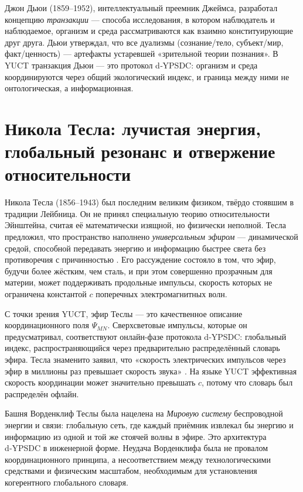 \documentclass[12pt,a4paper]{article}
\begin{document}
	Джон Дьюи (1859–1952), интеллектуальный преемник Джеймса, разработал концепцию \emph{транзакции} — способа исследования, в котором наблюдатель и наблюдаемое, организм и среда рассматриваются как взаимно конституирующие друг друга. Дьюи утверждал, что все дуализмы (сознание/тело, субъект/мир, факт/ценность) — артефакты устаревшей «зрительной теории познания». В YUCT транзакция Дьюи — это протокол d‑YPSDC: организм и среда координируются через общий экологический индекс, и граница между ними не онтологическая, а информационная.
	
	\section{Никола Тесла: лучистая энергия, глобальный резонанс и отвержение относительности}
	
	Никола Тесла (1856–1943) был последним великим физиком, твёрдо стоявшим в традиции Лейбница. Он не принял специальную теорию относительности Эйнштейна, считая её математически изящной, но физически неполной. Тесла предложил, что пространство наполнено \emph{универсальным эфиром} — динамической средой, способной передавать энергию и информацию быстрее света без противоречия с причинностью \cite{Tesla1932}. Его рассуждение состояло в том, что эфир, будучи более жёстким, чем сталь, и при этом совершенно прозрачным для материи, может поддерживать продольные импульсы, скорость которых не ограничена константой \(c\) поперечных электромагнитных волн.
	
	С точки зрения YUCT, эфир Теслы — это качественное описание координационного поля \(\Psi_{MN}\). Сверхсветовые импульсы, которые он предусматривал, соответствуют онлайн-фазе протокола d‑YPSDC: глобальный индекс, распространяющийся через предварительно распределённый словарь эфира. Тесла знаменито заявил, что «скорость электрических импульсов через эфир в миллионы раз превышает скорость звука» \cite{Tesla1907}. На языке YUCT эффективная скорость координации может значительно превышать \(c\), потому что словарь был распределён офлайн.
	
	Башня Ворденклиф Теслы была нацелена на \emph{Мировую систему} беспроводной энергии и связи: глобальную сеть, где каждый приёмник извлекал бы энергию и информацию из одной и той же стоячей волны в эфире. Это архитектура d‑YPSDC в инженерной форме. Неудача Ворденклифа была не провалом координационного принципа, а несоответствием между технологическими средствами и физическим масштабом, необходимым для установления когерентного глобального словаря.
	
\end{document}
